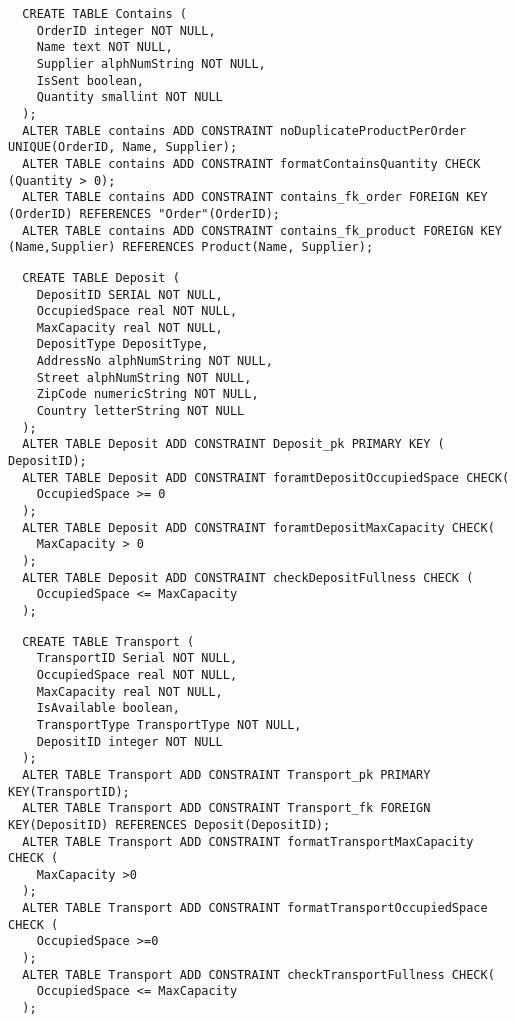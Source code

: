 \begin{lstlisting}
  CREATE TABLE Contains (
    OrderID integer NOT NULL,
    Name text NOT NULL,
    Supplier alphNumString NOT NULL,
    IsSent boolean,
    Quantity smallint NOT NULL
  );
  ALTER TABLE contains ADD CONSTRAINT noDuplicateProductPerOrder UNIQUE(OrderID, Name, Supplier);
  ALTER TABLE contains ADD CONSTRAINT formatContainsQuantity CHECK (Quantity > 0);
  ALTER TABLE contains ADD CONSTRAINT contains_fk_order FOREIGN KEY (OrderID) REFERENCES "Order"(OrderID);
  ALTER TABLE contains ADD CONSTRAINT contains_fk_product FOREIGN KEY (Name,Supplier) REFERENCES Product(Name, Supplier);
\end{lstlisting}
\begin{lstlisting}
  CREATE TABLE Deposit (
    DepositID SERIAL NOT NULL,
    OccupiedSpace real NOT NULL,
    MaxCapacity real NOT NULL,
    DepositType DepositType,
    AddressNo alphNumString NOT NULL,
    Street alphNumString NOT NULL,
    ZipCode numericString NOT NULL,
    Country letterString NOT NULL
  );
  ALTER TABLE Deposit ADD CONSTRAINT Deposit_pk PRIMARY KEY ( DepositID);
  ALTER TABLE Deposit ADD CONSTRAINT foramtDepositOccupiedSpace CHECK(
    OccupiedSpace >= 0
  );
  ALTER TABLE Deposit ADD CONSTRAINT foramtDepositMaxCapacity CHECK(
    MaxCapacity > 0
  );
  ALTER TABLE Deposit ADD CONSTRAINT checkDepositFullness CHECK (
    OccupiedSpace <= MaxCapacity
  );
\end{lstlisting}

\begin{lstlisting}
  CREATE TABLE Transport (
    TransportID Serial NOT NULL,
    OccupiedSpace real NOT NULL,
    MaxCapacity real NOT NULL,
    IsAvailable boolean, 
    TransportType TransportType NOT NULL,
    DepositID integer NOT NULL
  );
  ALTER TABLE Transport ADD CONSTRAINT Transport_pk PRIMARY KEY(TransportID);
  ALTER TABLE Transport ADD CONSTRAINT Transport_fk FOREIGN KEY(DepositID) REFERENCES Deposit(DepositID);
  ALTER TABLE Transport ADD CONSTRAINT formatTransportMaxCapacity CHECK (
    MaxCapacity >0
  );
  ALTER TABLE Transport ADD CONSTRAINT formatTransportOccupiedSpace CHECK (
    OccupiedSpace >=0
  );
  ALTER TABLE Transport ADD CONSTRAINT checkTransportFullness CHECK(
    OccupiedSpace <= MaxCapacity
  );
\end{lstlisting}

